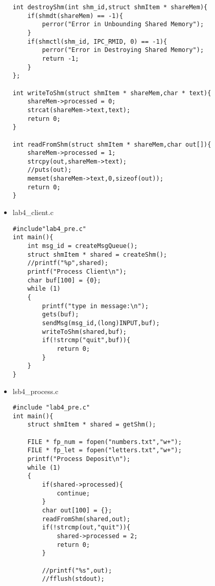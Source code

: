 \documentclass[UTF8]{ctexart}
\begin{document}
\begin{itemize}
\begin{lstlisting}
int destroyShm(int shm_id,struct shmItem * shareMem){
    if(shmdt(shareMem) == -1){
        perror("Error in Unbounding Shared Memory");
    }
    if(shmctl(shm_id, IPC_RMID, 0) == -1){
        perror("Error in Destroying Shared Memory");
        return -1;
    }
};

int writeToShm(struct shmItem * shareMem,char * text){
    shareMem->processed = 0;
    strcat(shareMem->text,text);
    return 0;
}

int readFromShm(struct shmItem * shareMem,char out[]){
    shareMem->processed = 1;
    strcpy(out,shareMem->text);
    //puts(out);
    memset(shareMem->text,0,sizeof(out));
    return 0;
}
\end{lstlisting}
\item lab4\_client.c
\begin{lstlisting}
#include"lab4_pre.c"
int main(){
    int msg_id = createMsgQueue();
    struct shmItem * shared = createShm();
    //printf("%p",shared);
    printf("Process Client\n");
    char buf[100] = {0};
    while (1)
    {
        printf("type in message:\n");
        gets(buf);
        sendMsg(msg_id,(long)INPUT,buf);
        writeToShm(shared,buf);
        if(!strcmp("quit",buf)){
            return 0;
        }
    }
}
\end{lstlisting}
\item lsb4\_process.c
\begin{lstlisting}
#include "lab4_pre.c"
int main(){
    struct shmItem * shared = getShm();
    
    FILE * fp_num = fopen("numbers.txt","w+");
    FILE * fp_let = fopen("letters.txt","w+");
    printf("Process Deposit\n");
    while (1)
    {
        if(shared->processed){
            continue;
        }
        char out[100] = {};
        readFromShm(shared,out);
        if(!strcmp(out,"quit")){
            shared->processed = 2;
            return 0;
        }
        
        //printf("%s",out);
        //fflush(stdout);
        


\end{lstlisting}
\end{itemize}
\end{document}
